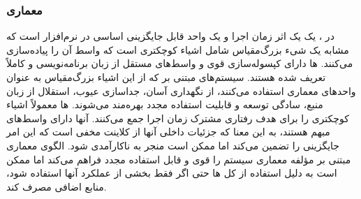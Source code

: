 \subsubsection{معماری }
\label{archCompBasedSec}
\begin{RTL}
در ،
یک  یک اثر زمان اجرا و یک واحد قابل
جایگزینی اساسی در نرم‌افزار است
که مشابه یک شیء بزرگ‌مقیاس شامل اشیاء کوچکتری است که واسط آن را
پیاده‌سازی می‌کنند. ها دارای کپسوله‌سازی قوی و
واسط‌های مستقل از زبان برنامه‌نویسی و کاملاً تعریف شده هستند.
سیستم‌های مبتنی بر 
که از این اشیاء بزرگ‌مقیاس به عنوان واحدهای معماری استفاده می‌کنند، از نگهداری
آسان، جداسازی عیوب، استقلال از زبان منبع، سادگی توسعه و قابلیت استفاده مجدد
بهره‌مند می‌شوند. ها معمولاً اشیاء کوچکتری را
برای هدف رفتاری مشترک زمان اجرا جمع می‌کنند.
آنها دارای واسط‌های مبهم هستند، به این معنا که جزئیات
داخلی آنها از کلاینت مخفی است که این امر جایگزینی را تضمین می‌کند
اما ممکن است منجر به ناکارآمدی شود. الگوی معماری مبتنی بر مؤلفه معماری
سیستم را قوی و قابل استفاده مجدد فراهم می‌کند اما ممکن است به دلیل
استفاده از کل ها حتی اگر فقط بخشی از عملکرد آنها
استفاده شود، منابع اضافی مصرف کند.
\end{RTL}